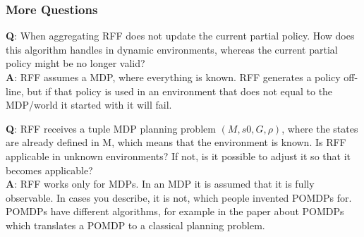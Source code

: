 \documentclass{beamer}
\let\origframetitle=\frametitle
\renewcommand\frametitle[1]{\origframetitle{\textbf{\large{\textrm{#1}}}}}
\begin{document}
\begin{frame}
  \frametitle{More Questions}

  \begin{itemize}
     {\item \textbf{Q}: When aggregating RFF does not update the current partial
      policy. How does this algorithm handles in dynamic environments, whereas
      the current partial policy might be no longer valid?
      \\ \textbf{A}: RFF assumes a MDP, where everything is known. RFF generates
      a policy off-line, but if that policy is used in an environment that does
      not equal to the MDP/world it started with it will fail.
    }

     {\item \textbf{Q}: RFF receives a tuple MDP planning problem $(M, s0, G,
      \rho)$, where the states are already defined in M, which means that the
      environment is known.  Is RFF applicable in unknown environments?  If not,
      is it possible to adjust it so that it becomes applicable?
      \\ \textbf{A}: RFF works only for MDPs. In an MDP it is assumed that it is
      fully observable. In cases you describe, it is not, which people invented
      POMDPs for. POMDPs have different algorithms, for example in the paper
      about POMDPs which translates a POMDP to a classical planning problem.
    }
  \end{itemize}

\end{frame}
\end{document}
